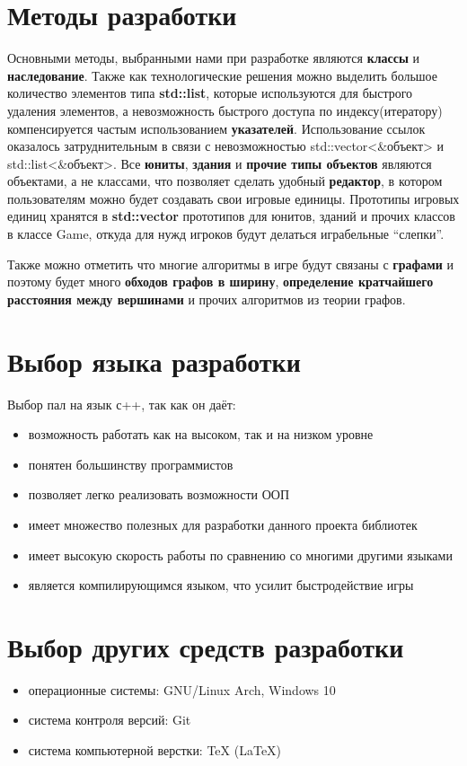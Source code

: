 \documentclass[a4paper,12pt,fleqn]{article} %
\begin{document}
\section{Методы разработки}
Основными методы, выбранными нами при разработке являются \textbf{классы} и \textbf{наследование}.
Также как технологические решения можно выделить большое количество элементов типа \textbf{std::list},
 которые используются для быстрого удаления элементов,
 а невозможность быстрого доступа по индексу(итератору) компенсируется частым использованием \textbf{указателей}.
 Использование ссылок оказалось затруднительным в связи с невозможностью std::vector<\&объект> и std::list<\&объект>.
 Все \textbf{юниты}, \textbf{здания} и \textbf{прочие типы объектов} являются объектами, а не классами,
 что позволяет сделать удобный \textbf{редактор}, в котором пользователям можно будет создавать свои игровые единицы. 
Прототипы игровых единиц хранятся в \textbf{std::vector} прототипов для юнитов,
 зданий и прочих классов в классе Game, откуда для нужд игроков будут делаться играбельные ``слепки''.

Также можно отметить что многие алгоритмы в игре будут связаны с \textbf{графами} и поэтому
 будет много \textbf{обходов графов в ширину}, \textbf{определение кратчайшего расстояния между вершинами}
 и прочих алгоритмов из теории графов.

\newpage
\section{Выбор языка разработки}
Выбор пал на язык с++, так как он даёт:
\begin{itemize}
    \item возможность работать как на высоком, так и на низком уровне
    \item понятен большинству программистов
    \item позволяет легко реализовать возможности ООП
    \item имеет множество полезных для разработки данного проекта библиотек
    \item имеет высокую скорость работы по сравнению со многими другими языками
    \item является компилирующимся языком, что усилит быстродействие игры
\end{itemize}

\newpage
\section{Выбор других средств разработки}
\begin{itemize}
    \item операционные системы: GNU/Linux Arch, Windows 10
    \item система контроля версий: Git
    \item система компьютерной верстки: TeX (LaTeX)
\end{itemize}
\end{document}
